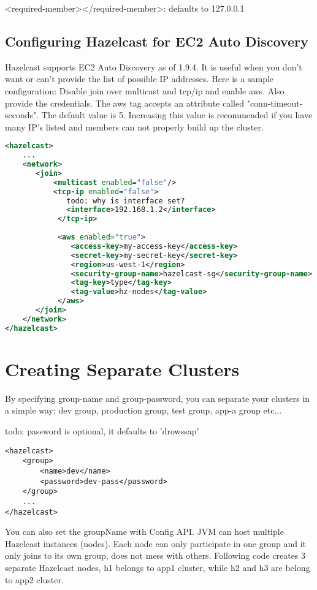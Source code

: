 <required-member></required-member>: defaults to 127.0.0.1


\subsection{Configuring Hazelcast for EC2 Auto Discovery}

Hazelcast supports EC2 Auto Discovery as of 1.9.4. It is useful when you don't want or can't provide the list of possible IP addresses. Here is a sample configuration: Disable join over multicast and tcp/ip and enable aws. Also provide the credentials. The aws tag accepts an attribute called "conn-timeout-seconds". The default value is 5. Increasing this value is recommended if you have many IP's listed and members can not properly build up the cluster.


\begin{lstlisting}[language=xml]
<hazelcast>
    ...
    <network>
       <join>
           <multicast enabled="false"/>
           <tcp-ip enabled="false">
              todo: why is interface set?
              <interface>192.168.1.2</interface>
            </tcp-ip>
    
            <aws enabled="true">
               <access-key>my-access-key</access-key>
               <secret-key>my-secret-key</secret-key>
               <region>us-west-1</region>                              <!-- optional, default is us-east-1 -->
               <security-group-name>hazelcast-sg</security-group-name> <!-- optional -->
               <tag-key>type</tag-key>                                  <!-- optional -->
               <tag-value>hz-nodes</tag-value>                          <!-- optional -->
            </aws>
       </join>
    </network>
</hazelcast>
\end{lstlisting}

\section{Creating Separate Clusters}

By specifying group-name and group-password, you can separate your clusters in a simple way; dev group, production group, test group, app-a group etc... 

todo: password is optional, it defaults to 'drowssap'

\begin{verbatim}
<hazelcast>
    <group>
        <name>dev</name>
        <password>dev-pass</password>
    </group>
    ...
</hazelcast>
\end{verbatim}
You can also set the groupName with Config API. JVM can host multiple Hazelcast instances (nodes). Each node can only participate in one group and it only joins to its own group, does not mess with others. Following code creates 3 separate Hazelcast nodes, h1 belongs to app1 cluster, while h2 and h3 are belong to app2 cluster.

